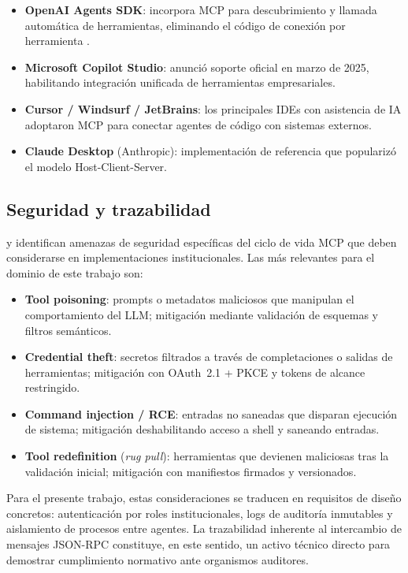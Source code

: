 \begin{itemize}
  \item \textbf{OpenAI Agents SDK}: incorpora MCP para descubrimiento y llamada automática de herramientas, eliminando el código de conexión por herramienta \citep{hou2025model}.
  \item \textbf{Microsoft Copilot Studio}: anunció soporte oficial en marzo de 2025, habilitando integración unificada de herramientas empresariales.
  \item \textbf{Cursor / Windsurf / JetBrains}: los principales IDEs con asistencia de IA adoptaron MCP para conectar agentes de código con sistemas externos.
  \item \textbf{Claude Desktop} (Anthropic): implementación de referencia que popularizó el modelo Host-Client-Server.
\end{itemize}

\subsection{Seguridad y trazabilidad}

\citet{hou2025model} y \citet{ehtesham2025survey} identifican amenazas de seguridad específicas del ciclo de vida MCP que deben considerarse en implementaciones institucionales. Las más relevantes para el dominio de este trabajo son:

\begin{itemize}
  \item \textbf{Tool poisoning}: prompts o metadatos maliciosos que manipulan el comportamiento del LLM; mitigación mediante validación de esquemas y filtros semánticos.
  \item \textbf{Credential theft}: secretos filtrados a través de completaciones o salidas de herramientas; mitigación con OAuth~2.1 + PKCE y tokens de alcance restringido.
  \item \textbf{Command injection / RCE}: entradas no saneadas que disparan ejecución de sistema; mitigación deshabilitando acceso a shell y saneando entradas.
  \item \textbf{Tool redefinition} (\textit{rug pull}): herramientas que devienen maliciosas tras la validación inicial; mitigación con manifiestos firmados y versionados.
\end{itemize}

Para el presente trabajo, estas consideraciones se traducen en requisitos de diseño concretos: autenticación por roles institucionales, logs de auditoría inmutables y aislamiento de procesos entre agentes. La trazabilidad inherente al intercambio de mensajes JSON-RPC constituye, en este sentido, un activo técnico directo para demostrar cumplimiento normativo ante organismos auditores.

